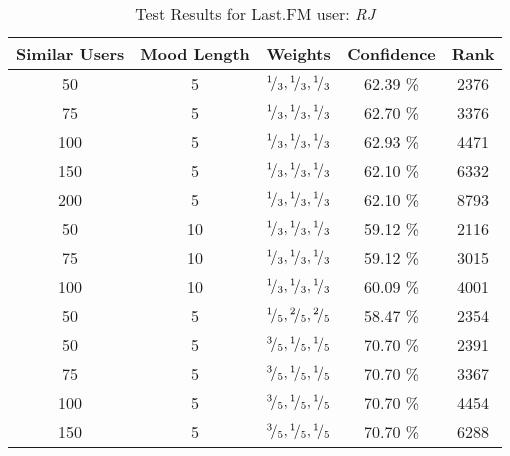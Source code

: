 \begin{table}[h!]
\centering
\begin{tabular}{ | c | c | c || c | c | }
\hline
Similar Users	& Mood Length	& Weights							&Confidence	&Rank\\
\hline \hline
50			& 5			& \({}^{1}\!/_{3}, {}^{1}\!/_{3}, {}^{1}\!/_{3}\)	&62.39 \%		&2376\\
\hline
75			& 5			& \({}^{1}\!/_{3}, {}^{1}\!/_{3}, {}^{1}\!/_{3}\)	&62.70 \%		&3376\\
\hline
100			& 5			& \({}^{1}\!/_{3}, {}^{1}\!/_{3}, {}^{1}\!/_{3}\)	&62.93 \%		&4471\\
\hline
150			& 5			& \({}^{1}\!/_{3}, {}^{1}\!/_{3}, {}^{1}\!/_{3}\)	&62.10 \%		&6332\\
\hline
200			& 5			& \({}^{1}\!/_{3}, {}^{1}\!/_{3}, {}^{1}\!/_{3}\)	&62.10 \%		&8793\\
\hline
50			& 10			& \({}^{1}\!/_{3}, {}^{1}\!/_{3}, {}^{1}\!/_{3}\)	&59.12 \%		&2116\\
\hline
75			& 10			& \({}^{1}\!/_{3}, {}^{1}\!/_{3}, {}^{1}\!/_{3}\)	&59.12 \%		&3015\\
\hline
100			& 10			& \({}^{1}\!/_{3}, {}^{1}\!/_{3}, {}^{1}\!/_{3}\)	&60.09 \%		&4001\\
\hline
50			& 5			& \({}^{1}\!/_{5}, {}^{2}\!/_{5}, {}^{2}\!/_{5}\)	&58.47 \%		&2354\\
\hline
50			& 5			& \({}^{3}\!/_{5}, {}^{1}\!/_{5}, {}^{1}\!/_{5}\)	&70.70 \%		&2391\\
\hline
75			& 5			& \({}^{3}\!/_{5}, {}^{1}\!/_{5}, {}^{1}\!/_{5}\)	&70.70 \%		&3367\\
\hline
100			& 5			& \({}^{3}\!/_{5}, {}^{1}\!/_{5}, {}^{1}\!/_{5}\)	&70.70 \%		&4454\\
\hline
150			& 5			& \({}^{3}\!/_{5}, {}^{1}\!/_{5}, {}^{1}\!/_{5}\)	&70.70 \%		&6288\\
\hline
\end{tabular}
\caption{Test Results for Last.FM user: \emph{RJ}}
\label{table:test_results_rj}
\end{table}

